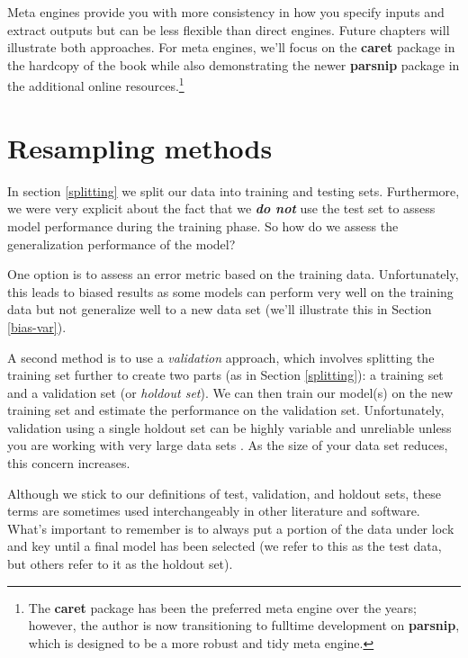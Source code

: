 \documentclass[]{krantz}
\makeatletter
\newenvironment{kframe}{%
\medskip{}
\setlength{\fboxsep}{.8em}
 \def\at@end@of@kframe{}%
 \ifinner\ifhmode%
  \def\at@end@of@kframe{\end{minipage}}%
  \begin{minipage}{\columnwidth}%
 \fi\fi%
 \def\FrameCommand##1{\hskip\@totalleftmargin \hskip-\fboxsep
 \colorbox{shadecolor}{##1}\hskip-\fboxsep
     \hskip-\linewidth \hskip-\@totalleftmargin \hskip\columnwidth}%
 \MakeFramed {\advance\hsize-\width
   \@totalleftmargin\z@ \linewidth\hsize
   \@setminipage}}%
 {\par\unskip\endMakeFramed%
 \at@end@of@kframe}
\newenvironment{block}[1]
  {
  \begin{itemize}
  \renewcommand{\labelitemi}{
    \raisebox{-.7\height}[0pt][0pt]{
      {\setkeys{Gin}{width=3em,keepaspectratio}\texttt{[image: icons/\#1]}}
    }
  }
  \setlength{\fboxsep}{1em}
  \begin{kframe}
  \item
  }
  {
  \end{kframe}
  \end{itemize}
  }
\newenvironment{note}
  {\begin{block}{note}}
  {\end{block}}
\makeatother
\begin{document}
Meta engines provide you with more consistency in how you specify inputs and extract outputs but can be less flexible than direct engines. Future chapters will illustrate both approaches. For meta engines, we'll focus on the \textbf{caret} package in the hardcopy of the book while also demonstrating the newer \textbf{parsnip} package in the additional online resources.\footnote{The \textbf{caret} package has been the preferred meta engine over the years; however, the author is now transitioning to fulltime development on \textbf{parsnip}, which is designed to be a more robust and tidy meta engine.}

\hypertarget{resampling}{%
\section{Resampling methods}\label{resampling}}

In section \ref{splitting} we split our data into training and testing sets. Furthermore, we were very explicit about the fact that we \textbf{\emph{do not}} use the test set to assess model performance during the training phase. So how do we assess the generalization performance of the model?

One option is to assess an error metric based on the training data. Unfortunately, this leads to biased results as some models can perform very well on the training data but not generalize well to a new data set (we'll illustrate this in Section \ref{bias-var}).

A second method is to use a \emph{validation} approach, which involves splitting the training set further to create two parts (as in Section \ref{splitting}): a training set and a validation set (or \emph{holdout set}). We can then train our model(s) on the new training set and estimate the performance on the validation set. Unfortunately, validation using a single holdout set can be highly variable and unreliable unless you are working with very large data sets \citep{molinaro2005prediction, hawkins2003assessing}. As the size of your data set reduces, this concern increases.

\begin{note}
Although we stick to our definitions of test, validation, and holdout
sets, these terms are sometimes used interchangeably in other literature
and software. What's important to remember is to always put a portion of
the data under lock and key until a final model has been selected (we
refer to this as the test data, but others refer to it as the holdout
set).
\end{note}
\end{document}
